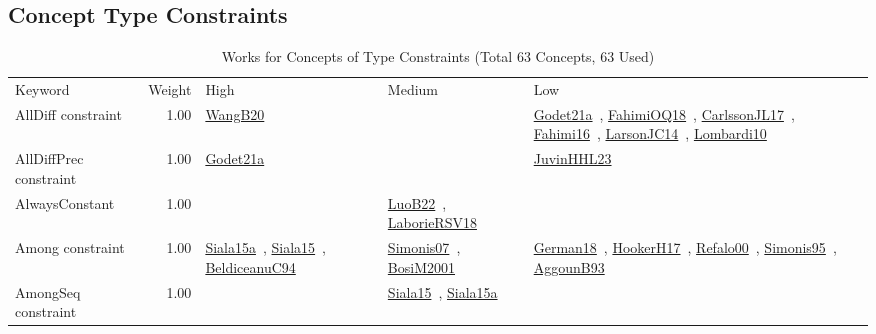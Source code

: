\subsection{Concept Type Constraints}
\label{sec:Constraints}
\label{Constraints}
{\scriptsize
\begin{longtable}{p{3cm}r>{\raggedright\arraybackslash}p{6cm}>{\raggedright\arraybackslash}p{6cm}>{\raggedright\arraybackslash}p{8cm}}
\rowcolor{white}\caption{Works for Concepts of Type Constraints (Total 63 Concepts, 63 Used)}\\ \toprule
\rowcolor{white}Keyword & Weight & High & Medium & Low\\ \midrule\endhead
\bottomrule
\endfoot
\index{AllDiff constraint}\index{Constraints!AllDiff constraint}AllDiff constraint &  1.00 & \href{../works/WangB20.pdf}{WangB20}~\cite{WangB20} &  & \href{../works/Godet21a.pdf}{Godet21a}~\cite{Godet21a}, \href{../works/FahimiOQ18.pdf}{FahimiOQ18}~\cite{FahimiOQ18}, \href{../works/CarlssonJL17.pdf}{CarlssonJL17}~\cite{CarlssonJL17}, \href{../works/Fahimi16.pdf}{Fahimi16}~\cite{Fahimi16}, \href{../works/LarsonJC14.pdf}{LarsonJC14}~\cite{LarsonJC14}, \href{../works/Lombardi10.pdf}{Lombardi10}~\cite{Lombardi10}\\
\index{AllDiffPrec constraint}\index{Constraints!AllDiffPrec constraint}AllDiffPrec constraint &  1.00 & \href{../works/Godet21a.pdf}{Godet21a}~\cite{Godet21a} &  & \href{../works/JuvinHHL23.pdf}{JuvinHHL23}~\cite{JuvinHHL23}\\
\index{AlwaysConstant}\index{Constraints!AlwaysConstant}AlwaysConstant &  1.00 &  & \href{../works/LuoB22.pdf}{LuoB22}~\cite{LuoB22}, \href{../works/LaborieRSV18.pdf}{LaborieRSV18}~\cite{LaborieRSV18} & \\
\index{Among constraint}\index{Constraints!Among constraint}Among constraint &  1.00 & \href{../works/Siala15a.pdf}{Siala15a}~\cite{Siala15a}, \href{../works/Siala15.pdf}{Siala15}~\cite{Siala15}, \href{../works/BeldiceanuC94.pdf}{BeldiceanuC94}~\cite{BeldiceanuC94} & \href{../works/Simonis07.pdf}{Simonis07}~\cite{Simonis07}, \href{../works/BosiM2001.pdf}{BosiM2001}~\cite{BosiM2001} & \href{../works/German18.pdf}{German18}~\cite{German18}, \href{../works/HookerH17.pdf}{HookerH17}~\cite{HookerH17}, \href{../works/Refalo00.pdf}{Refalo00}~\cite{Refalo00}, \href{../works/Simonis95.pdf}{Simonis95}~\cite{Simonis95}, \href{../works/AggounB93.pdf}{AggounB93}~\cite{AggounB93}\\
\index{AmongSeq constraint}\index{Constraints!AmongSeq constraint}AmongSeq constraint &  1.00 &  & \href{../works/Siala15.pdf}{Siala15}~\cite{Siala15}, \href{../works/Siala15a.pdf}{Siala15a}~\cite{Siala15a} & \\

\end{longtable}}
